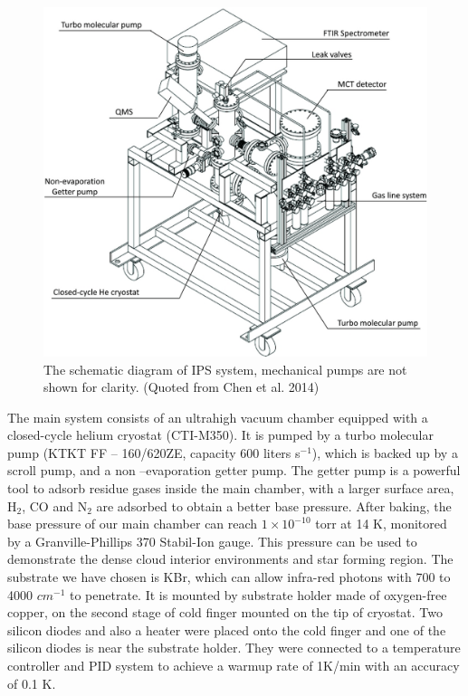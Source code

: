 \begin{figure}
\centering
\includegraphics[width=\textwidth]{figures/chapter2/system.jpg}
\caption{The schematic diagram of IPS system, mechanical pumps are not shown for clarity. (Quoted from Chen et al. 2014)}
\label{fig:system}
\end{figure}

The main system consists of an ultrahigh vacuum chamber equipped with a closed-cycle helium cryostat (CTI-M350). It is pumped by a turbo molecular pump (KTKT FF – 160/620ZE, capacity 600 liters s$^{-1}$), which is backed up by a scroll pump, and a non –evaporation getter pump. The getter pump is a powerful tool to adsorb residue gases inside the main chamber, with a larger surface area, H$_2$, CO and N$_2$ are adsorbed to obtain a better base pressure. After baking, the base pressure of our main chamber can reach $1 \times 10^{-10}$ torr at 14 K, monitored by a Granville-Phillips 370 Stabil-Ion gauge. This pressure can be used to demonstrate the dense cloud interior environments and star forming region. The substrate we have chosen is KBr, which can allow infra-red photons with 700 to 4000 $cm^{-1}$ to penetrate. It is mounted by substrate holder made of oxygen-free copper, on the second stage of cold finger mounted on the tip of cryostat. Two silicon diodes and also a heater were placed onto the cold finger and one of the silicon diodes is near the substrate holder. They were connected to a temperature controller and PID system to achieve a warmup rate of 1K/min with an accuracy of 0.1 K.

